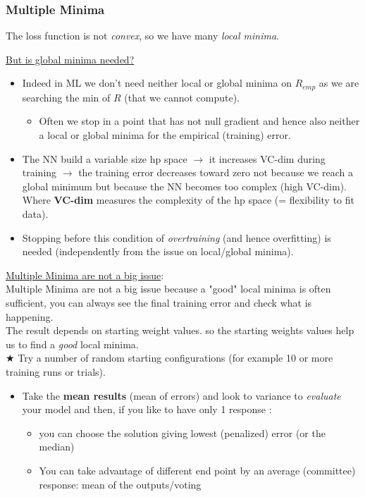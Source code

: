 \documentclass[../main.tex]{subfiles}
\begin{document}
\subsubsection{Multiple Minima}
The loss function is not \emph{convex}, so we have many \emph{local minima}.

\noindent \underline{But is global minima needed?}\\
\begin{itemize}
    \item Indeed in ML we don’t need neither local or global minima on $R_{emp}$ as we are searching the min of $R$ (that we cannot compute).
    \begin{itemize}
        \item Often we stop in a point that has not null gradient and hence also neither a local or global minima for the empirical (training) error.
    \end{itemize}
    \item The NN build a variable size hp space $\rightarrow$ it increases VC-dim during training $\rightarrow$ the training error decreases toward zero not because we reach a global minimum but because the NN becomes too complex (high VC-dim).\\
    Where \textbf{VC-dim} measures the complexity of the hp space (= flexibility to fit data).
    \item Stopping before this condition of \emph{overtraining} (and hence overfitting) is needed (independently from the issue on local/global minima).
\end{itemize}

\noindent \underline{Multiple Minima are not a big issue}:\\

Multiple Minima are not a big issue because a "good" local minima is often sufficient, you can always see the final training error and check what is happening.\\

The result depends on starting weight values. so the starting weights values help us to find a \emph{good} local minima.\\

\noindent $\bigstar$ Try a number of random starting configurations (for example 10 or more training runs or trials).
\begin{itemize}
    \item Take the \textbf{mean results} (mean of errors) and look to variance to \emph{evaluate} your model and then, if you like to have only 1 response :
    \begin{itemize}
        \item you can choose the solution giving lowest (penalized) error (or the median)
        \item You can take advantage of different end point by an average (committee) response: mean of the outputs/voting
    \end{itemize}
\end{itemize}
\end{document}
